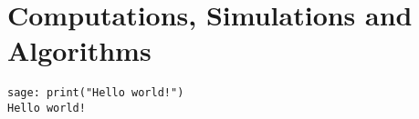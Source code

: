 \section{Computations, Simulations and Algorithms}\label{sec:computations}

\begin{lstlisting}[caption = {Simple computer program}, captionpos=b]
sage: print("Hello world!")
Hello world!
\end{lstlisting}



